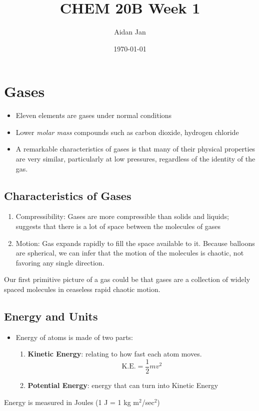 \documentclass[10pt]{article}
\title{CHEM 20B Week 1}
\author{Aidan Jan}
\date{\today}
\begin{document}
\maketitle
\section*{Gases}
\begin{itemize}
    \item Eleven elements are gases under normal conditions
    \item Lower \textit{molar mass} compounds such as carbon dioxide, hydrogen chloride
    \item A remarkable characteristics of gases is that many of their physical properties are very similar, particularly at low pressures, regardless of the identity of the gas.
\end{itemize}   

\subsection*{Characteristics of Gases}
\begin{enumerate}
    \item Compressibility: Gases are more compressible than solids and liquids; suggests that there is a lot of space between the molecules of gases
    \item Motion: Gas expands rapidly to fill the space available to it.  Because balloons are spherical, we can infer that the motion of the molecules is chaotic, not favoring any single direction.
\end{enumerate}
Our first primitive picture of a gas could be that gases are a collection of widely spaced molecules in ceaseless rapid chaotic motion.

\subsection*{Energy and Units}
\begin{itemize}
    \item Energy of atoms is made of two parts:
    \begin{enumerate}
        \item \textbf{Kinetic Energy}: relating to how fast each atom moves.
            \[\text{K.E.} = \frac{1}{2}mv^2\]
        \item \textbf{Potential Energy}: energy that can turn into Kinetic Energy
    \end{enumerate}
\end{itemize}
Energy is measured in Joules (1 J = 1 kg m$^2$/sec$^2$)
\end{document}
